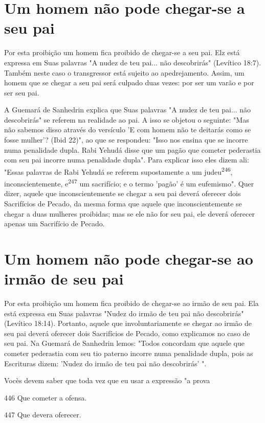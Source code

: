 \begin{itemize}
\begin{enumrate}
\begin{itemize}
\begin{itemize}
\begin{itemize}
\section{Um homem não pode chegar-se a seu pai}

Por esta proibição um homem fica proibido de chegar-se a seu pai. Elz
está expressa em Suas palavras "A nudez de teu pai... não descobrirás"
(Le­vítico 18:7). Também neste caso o transgressor está sujeito ao
apedrejamento. Assim, um homem que se chegar a seu pai será culpado duas
vezes: por ser um varão e por ser seu pai.

A Guemará de Sanhedrin explica que Suas palavras "A nudez de teu pai...
não descobrirás" se referem na realidade ao pai. A isso se objetou o
se­guinte: "Mas não sabemos disso através do versículo 'E com homem não
te dei­tarás como se fosse mulher'? (Ibid 22)", ao que se respondeu:
"Isso nos ensina que se incorre numa penalidade dupla. Rabi Yehudá disse
que um pagão que cometer pederastia com seu pai incorre numa penalidade
dupla". Para explicar isso eles dizem ali: "Essas palavras de Rabi
Yehudá se referem supostamente a um judeu\textsuperscript{246},
inconscientemente, e\textsuperscript{247} um sacrifício; e o termo
'pagão' é um eufemismo". Quer dizer, aquele que inconscientemente se
chegar a seu pai de­verá oferecer dois Sacrifícios de Pecado, da mesma
forma que aquele que in­conscientemente se chegar a duas mulheres
proibidas; mas se ele não for seu pai, ele deverá oferecer apenas um
Sacrifício de Pecado.

\section{Um homem não pode chegar-se ao irmão de seu pai}

Por esta proibição um homem fica proibido de chegar-se ao irmão de seu
pai. Ela está expressa em Suas palavras "Nudez do irmão de teu pai não
descobrirás" (Levítico 18:14). Portanto, aquele que involuntariamente se
che­gar ao irmão de seu pai deverá oferecer dois Sacrifícios de Pecado,
como expli­camos no caso de seu pai. Na Guemará de Sanhedrin lemos:
"Todos concor­dam que aquele que cometer pederastia com seu tio paterno
incorre numa pe­nalidade dupla, pois as Escrituras dizem: 'Nudez do
irmão de teu pai não descobrirás' ".


Vocès devem saber que toda vez que eu usar a expressão "a prova


446 Que cometer a ofensa.

447 Que devera oferecer.



\end{itemize}
\end{itemize}
\end{itemize}
\end{enumrate}
\end{itemize}
